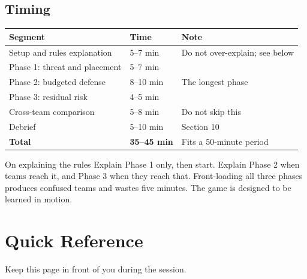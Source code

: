 \documentclass[11pt,letterpaper]{article}
\begin{document}
\subsection{Timing}

\begin{center}
\small
\begin{tabular}{@{}l l l@{}}
\toprule
\textbf{Segment} & \textbf{Time} & \textbf{Note} \\
\midrule
Setup and rules explanation & 5--7 min & Do not over-explain; see below \\
Phase 1: threat and placement & 5--7 min & \\
Phase 2: budgeted defense & 8--10 min & The longest phase \\
Phase 3: residual risk & 4--5 min & \\
Cross-team comparison & 5--8 min & Do not skip this \\
Debrief & 5--10 min & Section 10 \\
\midrule
\textbf{Total} & \textbf{35--45 min} & Fits a 50-minute period \\
\bottomrule
\end{tabular}
\end{center}

\begin{note}{On explaining the rules}
Explain Phase 1 only, then start. Explain Phase 2 when teams reach it, and
Phase 3 when they reach that. Front-loading all three phases produces confused
teams and wastes five minutes. The game is designed to be learned in motion.
\end{note}

\section{Quick Reference}

Keep this page in front of you during the session.
\end{document}
